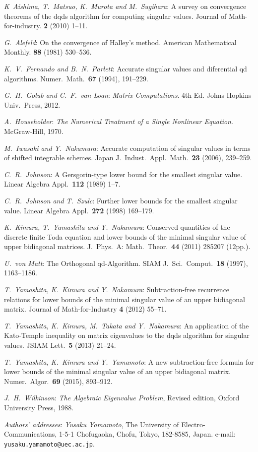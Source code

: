 \documentclass{amsart}
\begin{document}
{\small
\begin{thebibliography}{999}
{\it K~Aishima, T.~Matsuo, K.~Murota and M.~Sugihara}:
A survey on convergence theorems of the dqds algorithm for computing singular values. Journal of Math-for-industry. {\bf 2} (2010) 1--11.

{\it G.~Alefeld}: On the convergence of Halley's method. American Mathematical Monthly. {\bf 88} (1981) 530--536.

{\it K.~V.~Fernando and B.~N.~Parlett}: Accurate singular values and diferential qd algorithms. Numer.~Math.~{\bf 67} (1994), 191--229.

{\it G.~H.~Golub and C.~F.~van Loan}: 
{\it Matrix Computations}. 4th Ed.
Johns Hopkins Univ.~Press, 2012.

{\it A.~Householder}: {\it The Numerical Treatment of a Single Nonlinear Equation}. McGraw-Hill, 1970.

{\it M.~Iwasaki and Y.~Nakamura}: Accurate computation of singular values in terms of shifted integrable schemes. Japan J.~Indust.~Appl.~Math.~{\bf23} (2006), 239--259.

{\it C.~R.~Johnson}: A Gersgorin-type lower bound for the smallest singular value. Linear Algebra Appl.~{\bf 112} (1989) 1--7.

{\it C.~R.~Johnson and T.~Szulc}: Further lower bounds for the smallest singular value. Linear Algebra Appl.~{\bf 272} (1998) 169--179.

{\it K.~Kimura, T.~Yamashita and Y.~Nakamura}: Conserved quantities of the discrete finite Toda equation
and lower bounds of the minimal singular value of upper bidiagonal matrices. J.~Phys.~A: Math.~Theor.~{\bf 44} (2011) 285207 (12pp.).

{\it U.~von Matt}: The Orthogonal qd-Algorithm. SIAM J.~Sci.~Comput.~{\bf 18} (1997), 1163--1186.

{\it T.~Yamashita, K.~Kimura and Y.~Nakamura}: Subtraction-free recurrence relations for lower bounds of the minimal singular value of an upper bidiagonal matrix. Journal of Math-for-Industry {\bf 4} (2012) 55--71.

{\it T.~Yamashita, K.~Kimura, M.~Takata and Y.~Nakamura}:
An application of the Kato-Temple inequality on matrix eigenvalues to the dqds algorithm for singular values. JSIAM Lett.~{\bf 5} (2013) 21--24.

{\it T.~Yamashita, K.~Kimura and Y.~Yamamoto}: A new subtraction-free formula for lower bounds of the minimal singular value of an upper bidiagonal matrix. Numer.~Algor.~{\bf 69} (2015), 893--912.

{\it J.~H.~Wilkinson}: {\it The Algebraic Eigenvalue Problem}, Revised edition, Oxford University Press, 1988.
\end{thebibliography}}

{\small
{\em Authors' addresses}:
{\em Yusaku Yamamoto}, The University of Electro-Communications, 1-5-1 Chofugaoka, Chofu, Tokyo, 182-8585, Japan.
 e-mail: \texttt{yusaku.yamamoto@uec.ac.jp}.

}
\end{document}
